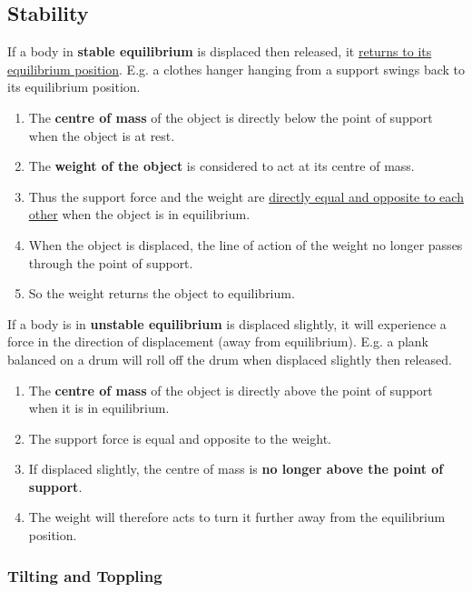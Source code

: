 \subsection{Stability}

If a body in \textbf{stable equilibrium} is displaced then released, it \underline{returns to its equilibrium position}. E.g. a clothes hanger hanging from a support swings back to its equilibrium position.
\begin{enumerate}
    \item The \textbf{centre of mass} of the object is directly below the point of support when the object is at rest.
    \item The \textbf{weight of the object} is considered to act at its centre of mass.
    \item Thus the support force and the weight are \underline{directly equal and opposite to each other} when the object is in equilibrium.
    \item When the object is displaced, the line of action of the weight no longer passes through the point of support.
    \item So the weight returns the object to equilibrium.
\end{enumerate}

If a body is in \textbf{unstable equilibrium} is displaced slightly, it will experience a force in the direction of displacement (away from equilibrium). E.g. a plank balanced on a drum will roll off the drum when displaced slightly then released.
\begin{enumerate}
    \item The \textbf{centre of mass} of the object is directly above the point of support when it is in equilibrium.
    \item The support force is equal and opposite to the weight.
    \item If displaced slightly, the centre of mass is \textbf{no longer above the point of support}.
    \item The weight will therefore acts to turn it further away from the equilibrium position.
\end{enumerate}

\subsubsection*{Tilting and Toppling}


